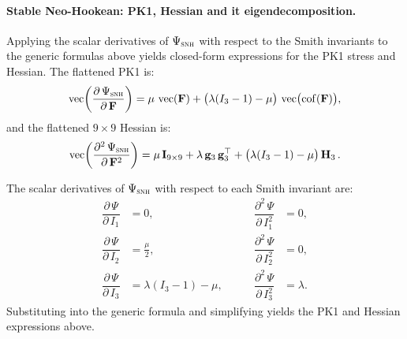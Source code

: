 \documentclass{article}
\newcommand{\pd}[2]{\dfrac{\partial\, #1}{\partial\, #2}}
\newcommand{\pdv}[2]{\dfrac{\partial^2\, #1}{\partial\, #2^2}}
\begin{document}
\paragraph{Stable Neo-Hookean: PK1, Hessian and it eigendecomposition.}
Applying the scalar derivatives of $\Psi_{\textsc{snh}}$ with respect to the Smith invariants to the generic formulas above yields closed-form expressions for the PK1 stress and Hessian. The flattened PK1 is:
\begin{equation}
    \operatorname{vec}\!\left(\pd{\Psi_{\textsc{snh}}}{\mathbf{F}}\right)
    = \mu\,\operatorname{vec}(\mathbf{F})
      + \bigl(\lambda(I_3 - 1) - \mu\bigr)\,
        \operatorname{vec}\bigl(\operatorname{cof}(\mathbf{F})\bigr),
\end{equation}
and the flattened $9\times 9$ Hessian is:
\begin{equation}
    \operatorname{vec}\!\left(\pdv{\Psi_{\textsc{snh}}}{\mathbf{F}}\right)
    = \mu\,\mathbf{I}_{9\times 9}
      + \lambda\,\mathbf{g}_3\,\mathbf{g}_3^\top
      + \bigl(\lambda(I_3 - 1) - \mu\bigr)\,\mathbf{H}_3\,.
\end{equation}
\begin{derivation}
The scalar derivatives of $\Psi_{\textsc{snh}}$ with respect to each Smith invariant are:
\begin{equation*}
\begin{aligned}
    \pd{\Psi}{I_1} &= 0, &\qquad \pdv{\Psi}{I_1} &= 0, \\[1ex]
    \pd{\Psi}{I_2} &= \frac{\mu}{2}, &\qquad \pdv{\Psi}{I_2} &= 0, \\[1ex]
    \pd{\Psi}{I_3} &= \lambda(I_3-1) - \mu, &\qquad \pdv{\Psi}{I_3} &= \lambda.
\end{aligned}
\end{equation*}
Substituting into the generic formula and simplifying yields the PK1 and Hessian expressions above.
\end{derivation}
\end{document}
